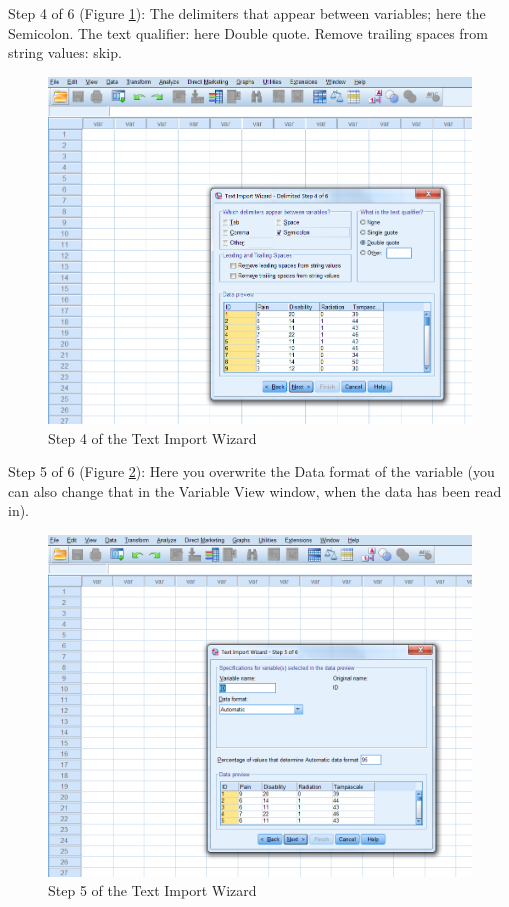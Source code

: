 \documentclass[
]{book}
\begin{document}
Step 4 of 6 (Figure \ref{fig:fig22}):
The delimiters that appear between variables; here the Semicolon.
The text qualifier: here Double quote.
Remove trailing spaces from string values: skip.

\begin{figure}

{\centering \includegraphics[width=0.95\linewidth]{images/fig1.22} 

}

\caption{Step 4 of the Text Import Wizard}\label{fig:fig22}
\end{figure}

Step 5 of 6 (Figure \ref{fig:fig23}):
Here you overwrite the Data format of the variable (you can also change that in the Variable View window, when the data has been read in).

\begin{figure}

{\centering \includegraphics[width=0.95\linewidth]{images/fig1.23} 

}

\caption{Step 5 of the Text Import Wizard}\label{fig:fig23}
\end{figure}
\end{document}
